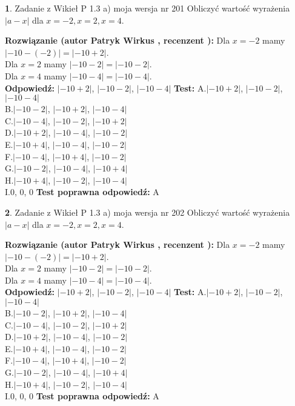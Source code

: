 \documentclass[12pt, a4paper]{article}
\theoremstyle{definition} %
\newtheorem{zad}{}
\newcommand{\zadStart}[1]{\begin{zad}#1\newline}
\newcommand{\zadStop}{\end{zad}}
\newcommand{\rozwStart}[2]{\noindent \textbf{Rozwiązanie (autor #1 , recenzent #2): }\newline}
\newcommand{\rozwStop}{\newline}
\newcommand{\odpStart}{\noindent \textbf{Odpowiedź:}\newline}
\newcommand{\odpStop}{\newline}
\newcommand{\testStart}{\noindent \textbf{Test:}\newline}
\newcommand{\testStop}{\newline}
\newcommand{\kluczStart}{\noindent \textbf{Test poprawna odpowiedź:}\newline}
\newcommand{\kluczStop}{\newline}
\begin{document}
\zadStart{Zadanie z Wikieł P 1.3 a) moja wersja nr 201}
Obliczyć wartość wyrażenia $|a - x|$ dla $x=-2,x=2,x=4$.
\zadStop
\rozwStart{Patryk Wirkus}{}
Dla $x = -2$ mamy $|-10 - (-2)| = |-10 + 2|$.\\
Dla $x = 2$ mamy $|-10 - 2| = |-10 - 2|$.\\
Dla $x = 4$ mamy $|-10 - 4| = |-10 - 4|$.\\
\rozwStop
\odpStart
$|-10 + 2|$, $|-10 - 2|$, $|-10 - 4|$
\odpStop
\testStart
A.$|-10 + 2|$, $|-10 - 2|$, $|-10 - 4|$\\
B.$|-10 - 2|$, $|-10 + 2|$, $|-10 - 4|$\\
C.$|-10 - 4|$, $|-10 - 2|$, $|-10 + 2|$\\
D.$|-10 + 2|$, $|-10 - 4|$, $|-10 - 2|$\\
E.$|-10 + 4|$, $|-10 - 4|$, $|-10 - 2|$\\
F.$|-10 - 4|$, $|-10 + 4|$, $|-10 - 2|$\\
G.$|-10 - 2|$, $|-10 - 4|$, $|-10 + 4|$\\
H.$|-10 + 4|$, $|-10 - 2|$, $|-10 - 4|$\\
I.$0$, $0$, $0$
\testStop
\kluczStart
A
\kluczStop



\zadStart{Zadanie z Wikieł P 1.3 a) moja wersja nr 202}
Obliczyć wartość wyrażenia $|a - x|$ dla $x=-2,x=2,x=4$.
\zadStop
\rozwStart{Patryk Wirkus}{}
Dla $x = -2$ mamy $|-10 - (-2)| = |-10 + 2|$.\\
Dla $x = 2$ mamy $|-10 - 2| = |-10 - 2|$.\\
Dla $x = 4$ mamy $|-10 - 4| = |-10 - 4|$.\\
\rozwStop
\odpStart
$|-10 + 2|$, $|-10 - 2|$, $|-10 - 4|$
\odpStop
\testStart
A.$|-10 + 2|$, $|-10 - 2|$, $|-10 - 4|$\\
B.$|-10 - 2|$, $|-10 + 2|$, $|-10 - 4|$\\
C.$|-10 - 4|$, $|-10 - 2|$, $|-10 + 2|$\\
D.$|-10 + 2|$, $|-10 - 4|$, $|-10 - 2|$\\
E.$|-10 + 4|$, $|-10 - 4|$, $|-10 - 2|$\\
F.$|-10 - 4|$, $|-10 + 4|$, $|-10 - 2|$\\
G.$|-10 - 2|$, $|-10 - 4|$, $|-10 + 4|$\\
H.$|-10 + 4|$, $|-10 - 2|$, $|-10 - 4|$\\
I.$0$, $0$, $0$
\testStop
\kluczStart
A
\kluczStop
\end{document}
